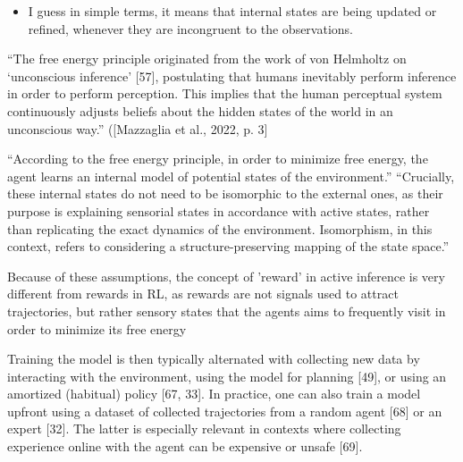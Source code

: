 \begin{itemize}
    \item I guess in simple terms, it means that internal states are being updated or refined, whenever they are incongruent to the observations.
\end{itemize}


\cite{mazzaglia_free_2022}
“The free energy principle originated from the work of von Helmholtz on ‘unconscious inference’ [57], postulating that humans inevitably perform inference in order to perform perception. This implies that the human perceptual system continuously adjusts beliefs about the hidden states of the world in an unconscious way.” ([Mazzaglia et al., 2022, p. 3]

“According to the free energy principle, in order to minimize free energy, the agent learns an internal model of potential states of the environment.”
“Crucially, these internal states do not need to be isomorphic to the external ones, as their purpose is explaining sensorial states in accordance with active states, rather than replicating the exact dynamics of the environment. Isomorphism, in this context, refers to considering a structure-preserving mapping of the state space.”

Because of these assumptions, the concept of 'reward' in active inference is very different from rewards in RL, as rewards are not signals used to attract trajectories, but rather sensory states that the agents aims to frequently visit in order to minimize its free energy

Training the model is then typically alternated with collecting new data by interacting with the environment, using the model for planning [49], or using an amortized (habitual) policy [67, 33]. In practice, one can also train a model upfront using a dataset of collected trajectories from a random agent [68] or an expert [32]. The latter is especially relevant in contexts where collecting experience online with the agent can be expensive or unsafe [69].



